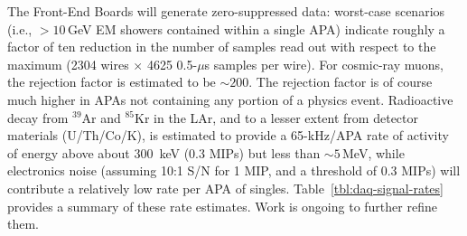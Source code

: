 The Front-End Boards will generate zero-suppressed data: worst-case 
scenarios (i.e., $>10\,$GeV EM showers contained within a single APA) 
indicate roughly a factor of ten reduction in the number of samples 
read out with respect to the maximum (2304 wires $\times$ 4625 0.5-$\mu$s 
samples per wire).  
For cosmic-ray muons, the rejection factor is estimated to be $\sim 200$.  
The rejection factor is of course much higher in APAs 
not containing any portion of a physics event.  Radioactive decay 
from $^{39}$Ar and $^{85}$Kr in the LAr, and to a lesser extent from 
detector materials (U/Th/Co/K), is estimated to provide a
65-kHz/APA rate of activity of energy above about 300~keV (0.3 MIPs) 
but less than $\sim 5\,$MeV, while 
electronics noise (assuming 10:1 S/N for 1 MIP, and a threshold of 0.3 MIPs) 
will contribute a relatively low rate per APA of singles.  
Table~\ref{tbl:daq-signal-rates} provides a summary of these rate 
estimates.  Work is ongoing to further refine them.
%
